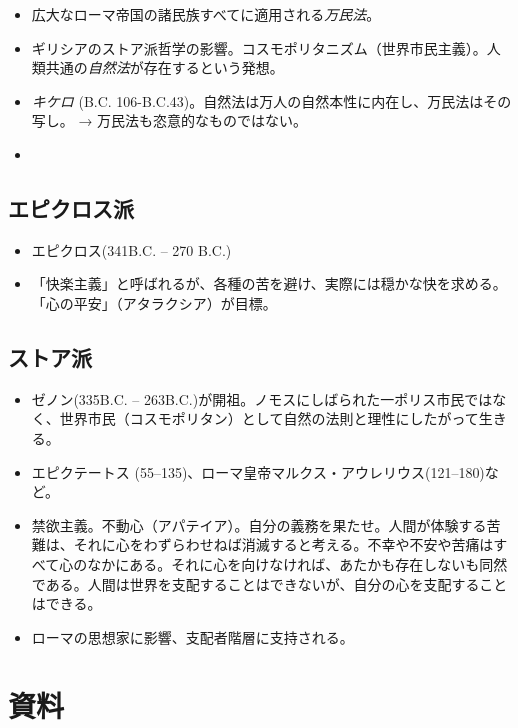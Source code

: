 \documentclass[uplatex,dvipdfmx]{jsarticle} \usepackage{mystyle}%
\begin{document}
\begin{itemize}
\item 広大なローマ帝国の諸民族すべてに適用される\emph{万民法}。
\item ギリシアのストア派哲学の影響。コスモポリタニズム（世界市民主義）。人類共通の\emph{自然法}が存在するという発想。
\item \emph{キケロ} (B.C. 106-B.C.43)。自然法は万人の自然本性に内在し、万民法はその写し。 → 万民法も恣意的なものではない。
\item   
\end{itemize}


\subsection{エピクロス派}

\begin{itemize}
\item エピクロス(341B.C. -- 270 B.C.)
\item 「快楽主義」と呼ばれるが、各種の苦を避け、実際には穏かな快を求める。「心の平安」（アタラクシア）が目標。

\end{itemize}

\subsection{ストア派}
\begin{itemize}
\item ゼノン(335B.C. -- 263B.C.)が開祖。ノモスにしばられた一ポリス市民ではなく、世界市民（コスモポリタン）として自然の法則と理性にしたがって生きる。

\item エピクテートス (55--135)、ローマ皇帝マルクス・アウレリウス(121--180)など。

\item   禁欲主義。不動心（アパテイア）。自分の義務を果たせ。人間が体験する苦難は、それに心をわずらわせねば消滅すると考える。不幸や不安や苦痛はすべて心のなかにある。それに心を向けなければ、あたかも存在しないも同然である。人間は世界を支配することはできないが、自分の心を支配することはできる。

\item   ローマの思想家に影響、支配者階層に支持される。
\end{itemize}





\section{資料}
\end{document}

